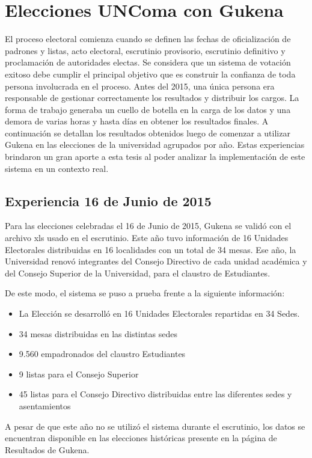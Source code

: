 \chapter{Elecciones UNComa con Gukena}
\label{Gukena2}
El proceso electoral comienza cuando se definen las fechas de oficialización de padrones y listas, acto electoral, escrutinio provisorio, escrutinio definitivo y proclamación de autoridades electas. Se considera que un sistema de votación exitoso debe cumplir el principal objetivo que es construir la confianza de toda persona involucrada en el proceso. 
Antes del 2015, una única persona era responsable de gestionar correctamente los resultados y distribuir los cargos. La forma de trabajo generaba un cuello de botella en la carga de los datos y una demora de varias horas y hasta días en obtener los resultados finales. \newline
A continuación se detallan los resultados obtenidos luego de comenzar a utilizar Gukena en las elecciones de la universidad agrupados por año. Estas experiencias brindaron un gran aporte a esta tesis al poder analizar la implementación de este sistema en un contexto real.

\section{Experiencia 16 de Junio de 2015}
Para las elecciones celebradas el 16 de Junio de 2015, Gukena se validó con el archivo xls usado en el escrutinio. Este año tuvo información de 16 Unidades Electorales distribuidas en 16 localidades con un total de 34 mesas. 
Ese año, la Universidad renovó integrantes del Consejo Directivo de cada unidad académica y del Consejo Superior de la Universidad, para el claustro de Estudiantes.

De este modo, el sistema se puso a prueba frente a la siguiente información:
\begin{itemize}
    \item La Elección se desarrolló en 16 Unidades Electorales repartidas en 34 Sedes.
    \item 34 mesas distribuidas en las distintas sedes
    \item 9.560 empadronados del claustro Estudiantes
    \item 9 listas para el Consejo Superior
    \item 45 listas para el Consejo Directivo distribuidas entre las diferentes sedes y asentamientos
\end{itemize}
A pesar de que este año no se utilizó el sistema durante el escrutinio, los datos se encuentran disponible en las elecciones históricas presente en la página de Resultados de Gukena.

